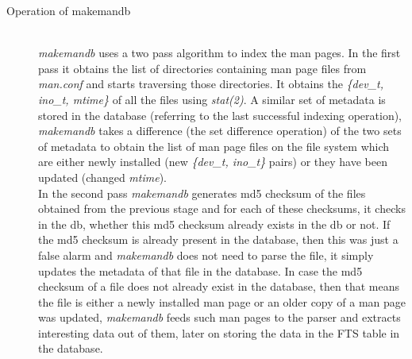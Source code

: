 \documentclass[letterpaper,twocolumn,10pt]{article}
\begin{document}
\begin{description}
\item[Operation of makemandb] \hfill \\
\textit{makemandb} uses a two pass algorithm to index the man pages. In the first pass it obtains the list of directories containing man page files from
\textit{man.conf} and starts traversing those directories. It obtains the
\textit{\{dev\_t, ino\_t, mtime\}} of all the files using \textit{stat(2)}.
A similar set of metadata is stored in the database (referring to the last successful indexing operation), \textit{makemandb} takes a difference (the set difference operation) of the two sets of metadata to obtain the list of man page files on the file system which are either newly installed (new \textit{\{dev\_t, ino\_t\}} pairs) or they have been updated (changed \textit{mtime}). \\

In the second pass \textit{makemandb} generates md5 checksum of the files obtained from the previous stage and for each of these checksums, it checks in
the db, whether this md5 checksum already exists in the db or not. If the md5 checksum is already present in the database, then this was just a false alarm and \textit{makemandb} does not need to parse the file, it simply updates the metadata of that file in the database. In case the md5 checksum of a file does not already exist in the database, then that means the file is either a newly installed man page or an older copy of a man page was updated,
\textit{makemandb} feeds such man pages to the parser and extracts interesting
data out of them, later on storing the data in the FTS table in the database.
\end{description}
\end{document}
